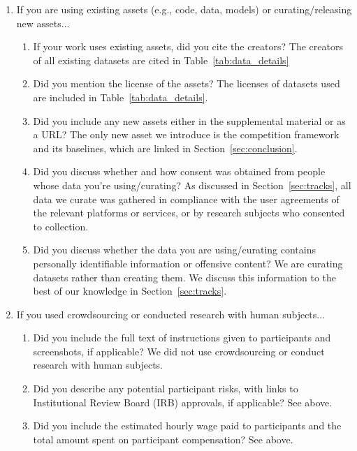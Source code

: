 \begin{enumerate}
\item If you are using existing assets (e.g., code, data, models) or curating/releasing new assets...
\begin{enumerate}
  \item If your work uses existing assets, did you cite the creators?
    \answerYes{} The creators of all existing datasets are cited in Table~\ref{tab:data_details}
  \item Did you mention the license of the assets?
    \answerYes{} The licenses of datasets used are included in Table~\ref{tab:data_details}.
  \item Did you include any new assets either in the supplemental material or as a URL?
    \answerYes{} The only new asset we introduce is the competition framework and its baselines, which are linked in Section~\ref{sec:conclusion}.
  \item Did you discuss whether and how consent was obtained from people whose data you're using/curating?
    \answerYes{} As discussed in Section~\ref{sec:tracks}, all data we curate was gathered in compliance with the user agreements of the relevant platforms or services, or by research subjects who consented to collection.
  \item Did you discuss whether the data you are using/curating contains personally identifiable information or offensive content?
    \answerYes{} We are curating datasets rather than creating them. We discuss this information to the best of our knowledge in Section~\ref{sec:tracks}.
\end{enumerate}

\item If you used crowdsourcing or conducted research with human subjects...
\begin{enumerate}
  \item Did you include the full text of instructions given to participants and screenshots, if applicable?
    \answerNA{} We did not use crowdsourcing or conduct research with human subjects.
  \item Did you describe any potential participant risks, with links to Institutional Review Board (IRB) approvals, if applicable?
    \answerNA{} See above.
  \item Did you include the estimated hourly wage paid to participants and the total amount spent on participant compensation?
    \answerNA{} See above.
\end{enumerate}

\end{enumerate}


